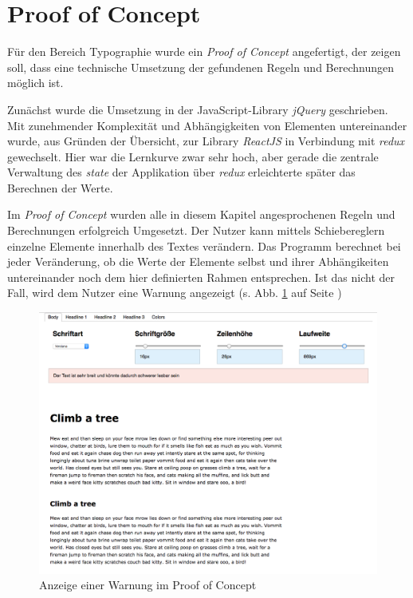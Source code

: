 
\section{Proof of Concept}

Für den Bereich Typographie wurde ein \textit{Proof of Concept} angefertigt, der zeigen soll, dass eine technische Umsetzung der gefundenen Regeln und Berechnungen möglich ist.

Zunächst wurde die Umsetzung in der JavaScript-Library \textit{jQuery} geschrieben. Mit zunehmender Komplexität und Abhängigkeiten von Elementen untereinander wurde, aus Gründen der Übersicht, zur Library \textit{ReactJS} in Verbindung mit \textit{redux} gewechselt. Hier war die Lernkurve zwar sehr hoch, aber gerade die zentrale Verwaltung des \textit{state} der Applikation über \textit{redux} erleichterte später das Berechnen der Werte.

Im \textit{Proof of Concept} wurden alle in diesem Kapitel angesprochenen Regeln und Berechnungen erfolgreich Umgesetzt. Der Nutzer kann mittels Schiebereglern einzelne Elemente innerhalb des Textes verändern. Das Programm berechnet bei jeder Veränderung, ob die Werte der Elemente selbst und ihrer Abhängikeiten untereinander noch dem hier definierten Rahmen entsprechen. Ist das nicht der Fall, wird dem Nutzer eine Warnung angezeigt (s. Abb. \ref{fig:pocWarning} auf Seite \pageref{fig:pocWarning})

\begin{figure}[h]
    \centering
    \includegraphics[width=1\textwidth]{images/poc-warning.png}
    \caption{Anzeige einer Warnung im Proof of Concept}
    \label{fig:pocWarning}
\end{figure}

